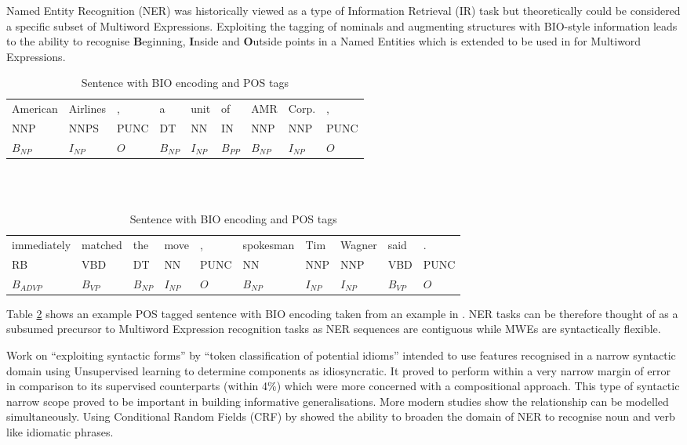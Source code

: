 Named Entity Recognition (NER) was historically viewed as a type of Information Retrieval (IR) task but theoretically could be considered a specific subset of Multiword Expressions. Exploiting the tagging of nominals and augmenting structures with BIO-style\cite{Ramshaw1994} information leads to the ability to recognise {\bf B}eginning, {\bf I}nside and {\bf O}utside points in a Named Entities which is extended to be used in \dimsum for Multiword Expressions.

\begin{table}[!htbp]
\small
\begin{framed}
 \begin{tabular}{lllllllll}
  American & Airlines & , & a & unit & of & AMR & Corp. & ,\\ 
  NNP & NNPS & PUNC & DT & NN & IN & NNP & NNP & PUNC \\
  $B_{NP}$ & $I_{NP}$ & $O$ & $B_{NP}$ & $I_{NP}$ & $B_{PP}$ & $B_{NP}$ & $I_{NP}$ & $O$
 \end{tabular}\\ \ \\

 \begin{tabular}{llllllllll}
  immediately & matched & the & move & , & spokesman & Tim & Wagner & said & .\\
  RB & VBD & DT & NN & PUNC & NN & NNP & NNP & VBD & PUNC\\
  $B_{ADVP}$ & $B_{VP}$ & $B_{NP}$ & $I_{NP}$ & $O$ & $B_{NP}$ & $I_{NP}$ & $I_{NP}$ & $B_{VP}$ & $O$
 \end{tabular}
\end{framed}
 \caption{Sentence with BIO encoding and POS tags}
 \label{tab:biotagseq}
\end{table}

Table \ref{tab:biotagseq} shows an example POS tagged sentence with BIO encoding taken from an example in \cite{martin2000speech}. NER tasks can be therefore thought of as a subsumed precursor to Multiword Expression recognition tasks as NER sequences are contiguous while MWEs are syntactically flexible.

Work on ``exploiting syntactic forms'' by ``token classification of potential idioms'' \cite{Cook2007} intended to use features recognised in a narrow syntactic domain using Unsupervised learning to determine components as idiosyncratic. It proved to perform within a very narrow margin of error in comparison to its supervised counterparts (within 4\%) which were more concerned with a compositional approach. This type of syntactic narrow scope proved to be important in building informative generalisations. More modern studies show the relationship can be modelled simultaneously. Using Conditional Random Fields (CRF) by \cite{Constant2011} showed the ability to broaden the domain of NER to recognise noun and verb like idiomatic phrases.

